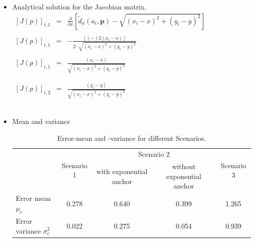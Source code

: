 \documentclass{article}
\begin{document}
\begin{itemize}

	\item Analytical solution for the Jacobian matrix.\\
	
	    $\begin{array}{ccc}
    
        \left[ J(p)\right]_{i,1} & = & \frac{\partial}{\partial x} \left[ \tilde{d}_n(a_i,\mathbf{p}) - \sqrt{(x_i - x)^2 + (y_i - y)^2} \right] \\\\
        \left[ J(p) \right]_{i,1} & = & -\frac{[(-)2(x_i-x)]}{2 \cdot\sqrt{(x_i - x)^2 + (y_i - y)^2}} \\\\
        \left[ J(p) \right]_{i,1} & = & \frac{(x_i-x)}{\sqrt{(x_i - x)^2 + (y_i - y)^2}}\\\\\\
        
        
        \left[ J(p) \right]_{i,2} & = & \frac{(y_i-y)}{\sqrt{(x_i - x)^2 + (y_i - y)^2}}\\\\\\

    \end{array}$


    \item Mean and variance

        \begin{table}[h]
        \centering
        \begin{tabular}{l||c||c|c||c|}
            \cline{2-5}
                                                       & \multirow{2}{*}{Scenario 1} & \multicolumn{2}{c||}{Scenario 2}                      & \multirow{2}{*}{Scenario 3} \\ \cline{3-4}
                                                       &                             & with exponential anchor & without exponential anchor &                             \\ \hline\hline
            \multicolumn{1}{|l||}{Error mean $\mu_{e}$}          & 0.278                      & 0.640                  & 0.399                     & 1.265                      \\ \hline
            \multicolumn{1}{|l||}{Error variance $\sigma^2_{e}$} & 0.022                      & 0.275                  & 0.054                     & 0.939                      \\ \hline
        \end{tabular}
        \caption{Error-mean and -variance for different Scenarios.}
        \label{tab:ls_mean_var}
        \end{table}
        

\end{itemize}
\end{document}
